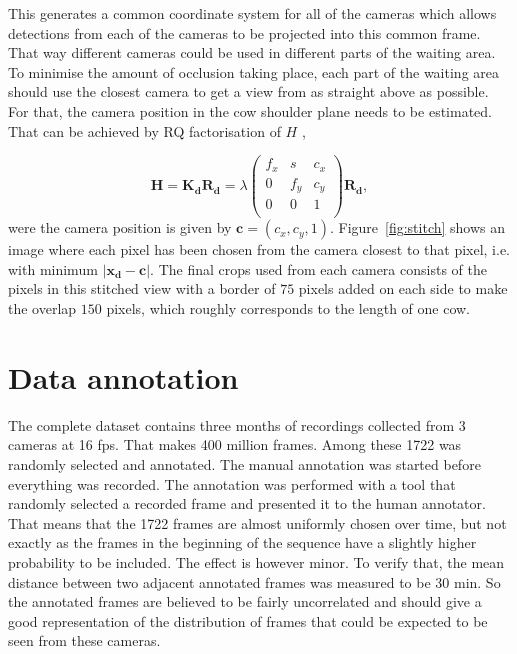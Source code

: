 \documentclass{cta-author}
\begin{document}
This generates a common coordinate system for all of the cameras which allows detections from each of the
cameras to be projected into this common frame. That way different cameras could be used in different parts
of the waiting area. To minimise the amount of occlusion taking place, each part of the waiting area should
use the closest camera to get a view from as straight above as possible. For that, the camera position in the
cow shoulder plane needs to be estimated. That can be achieved by RQ factorisation of $H$ \cite{Hartley2004},

\begin{equation}
\bm H = \bm {K_d} \bm {R_d} =
    \lambda
	\left(
	\begin{array}{ccc}
		f_x & s & c_x  \\
		0 & f_y & c_y  \\
		0 & 0 & 1  \\
	\end{array}
	\right)
	\bm {R_d} ,
\end{equation}
were the camera position is given by $\bm c = \left(c_x, c_y, 1\right)$. Figure~\ref{fig:stitch} shows an
image where each pixel has been chosen from the camera closest to that pixel, i.e. with  minimum $\left| \bm
{x_d} - \bm c \right|$. The final crops used from each camera consists of the pixels in this stitched view
with a border of $75$ pixels added on each side to make the overlap $150$ pixels, which roughly corresponds
to the length of one cow.


\section{Data annotation}

The complete dataset contains three months of recordings collected from 3 cameras at 16 fps. That makes 400
million frames. Among these 1722 was randomly selected and annotated. The manual annotation was started
before everything was recorded. The annotation was performed with a tool that randomly selected a recorded
frame and presented it to the human annotator. That means that the 1722 frames are almost uniformly chosen over time, but not exactly as the frames in the beginning of the sequence have a slightly higher probability to
be included. The effect is however minor. To verify that,
the mean distance between two adjacent annotated frames was measured to be 30 min. So the annotated frames are
believed to be fairly uncorrelated and should give a good representation of the distribution of frames that
could be expected to be seen from these cameras.
\end{document}
